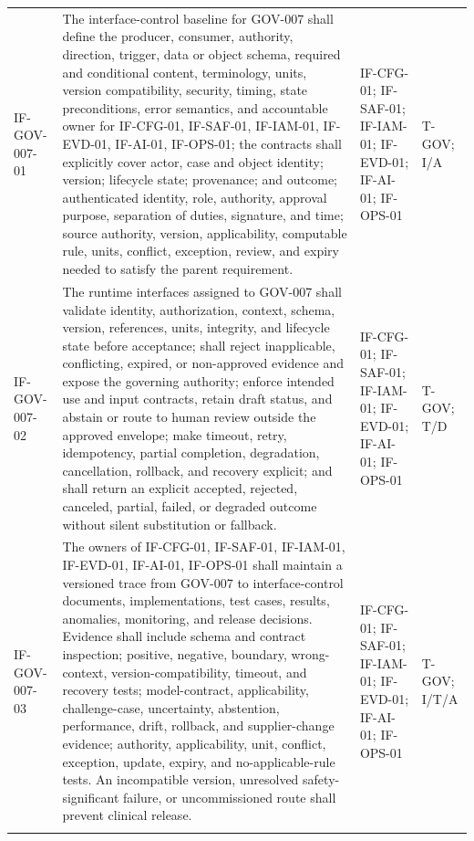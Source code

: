 \documentclass[11pt,letterpaper]{article}
\begin{document}
\begin{scriptsize}
\begin{longtable}{@{}L{0.14\textwidth}L{0.49\textwidth}L{0.19\textwidth}L{0.10\textwidth}@{}}
\addlinespace[2pt]
\mbox{IF-GOV-007-01} & The interface-control baseline for GOV-007 shall define the producer, consumer, authority, direction, trigger, data or object schema, required and conditional content, terminology, units, version compatibility, security, timing, state preconditions, error semantics, and accountable owner for IF-CFG-01, IF-SAF-01, IF-IAM-01, IF-EVD-01, IF-AI-01, IF-OPS-01; the contracts shall explicitly cover actor, case and object identity; version; lifecycle state; provenance; and outcome; authenticated identity, role, authority, approval purpose, separation of duties, signature, and time; source authority, version, applicability, computable rule, units, conflict, exception, review, and expiry needed to satisfy the parent requirement. & IF-CFG-01; IF-SAF-01; IF-IAM-01; IF-EVD-01; IF-AI-01; IF-OPS-01 & T-GOV; I\slash\allowbreak{}A \\
\addlinespace[2pt]
\mbox{IF-GOV-007-02} & The runtime interfaces assigned to GOV-007 shall validate identity, authorization, context, schema, version, references, units, integrity, and lifecycle state before acceptance; shall reject inapplicable, conflicting, expired, or non-approved evidence and expose the governing authority; enforce intended use and input contracts, retain draft status, and abstain or route to human review outside the approved envelope; make timeout, retry, idempotency, partial completion, degradation, cancellation, rollback, and recovery explicit; and shall return an explicit accepted, rejected, canceled, partial, failed, or degraded outcome without silent substitution or fallback. & IF-CFG-01; IF-SAF-01; IF-IAM-01; IF-EVD-01; IF-AI-01; IF-OPS-01 & T-GOV; T\slash\allowbreak{}D \\
\addlinespace[2pt]
\mbox{IF-GOV-007-03} & The owners of IF-CFG-01, IF-SAF-01, IF-IAM-01, IF-EVD-01, IF-AI-01, IF-OPS-01 shall maintain a versioned trace from GOV-007 to interface-control documents, implementations, test cases, results, anomalies, monitoring, and release decisions. Evidence shall include schema and contract inspection; positive, negative, boundary, wrong-context, version-compatibility, timeout, and recovery tests; model-contract, applicability, challenge-case, uncertainty, abstention, performance, drift, rollback, and supplier-change evidence; authority, applicability, unit, conflict, exception, update, expiry, and no-applicable-rule tests. An incompatible version, unresolved safety-significant failure, or uncommissioned route shall prevent clinical release. & IF-CFG-01; IF-SAF-01; IF-IAM-01; IF-EVD-01; IF-AI-01; IF-OPS-01 & T-GOV; I\slash\allowbreak{}T\slash\allowbreak{}A \\
\addlinespace[2pt]
\end{longtable}
\end{scriptsize}
\end{document}
